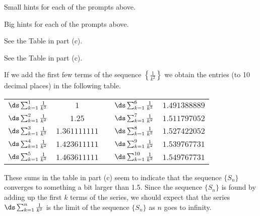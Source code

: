 \begin{smallhint}
\ba
	\item Small hints for each of the prompts above.
\ea
\end{smallhint}
\begin{bighint}
\ba
	\item Big hints for each of the prompts above.
\ea
\end{bighint}
\begin{activitySolution}
\ba
	\item See the Table in part (c).
    \item See the Table in part (c).
    \item If we add the first few terms of the sequence $\left\{\frac{1}{k^2}\right\}$ we obtain the entries (to 10 decimal places) in the following table.
\begin{center}
\renewcommand{\arraystretch}{1.5}
\begin{tabular}{c|c p{1.0in} c|c}
$\ds \sum_{k=1}^{1} \frac{1}{k^2}$   & $1$              &   &$\ds \sum_{k=1}^{6} \frac{1}{k^2}$   & $1.491388889$ \\
$\ds \sum_{k=1}^{2} \frac{1}{k^2}$   & $1.25$           &   &$\ds \sum_{k=1}^{7} \frac{1}{k^2}$   & $1.511797052$ \\
$\ds \sum_{k=1}^{3} \frac{1}{k^2}$   & $1.361111111$    &   &$\ds \sum_{k=1}^{8} \frac{1}{k^2}$   & $1.527422052$ \\
$\ds \sum_{k=1}^{4} \frac{1}{k^2}$   & $1.423611111$    &   &$\ds \sum_{k=1}^{9} \frac{1}{k^2}$   & $1.539767731$ \\
$\ds \sum_{k=1}^{5} \frac{1}{k^2}$   & $1.463611111$    &   &$\ds \sum_{k=1}^{10} \frac{1}{k^2}$  & $1.549767731$ \\
\end{tabular}
\end{center}
    \item These sums in the table in part (c) seem to indicate that the sequence $\{S_n\}$ converges to something a bit larger than 1.5. Since the sequence $\{S_n\}$ is found by adding up the first $k$ terms of the series, we should expect that the series $\ds \sum_{k=1}^{n} \frac{1}{k^2}$ is the limit of the sequence $\{S_n\}$ as $n$ goes to infinity.
\ea
\end{activitySolution}
\aftera 